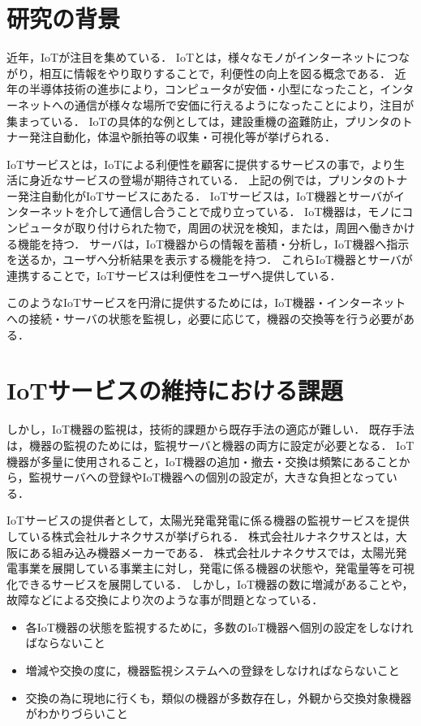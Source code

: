 \section{研究の背景}
近年，IoTが注目を集めている．
IoTとは，様々なモノがインターネットにつながり，相互に情報をやり取りすることで，利便性の向上を図る概念である．
近年の半導体技術の進歩により，コンピュータが安価・小型になったこと，インターネットへの通信が様々な場所で安価に行えるようになったことにより，注目が集まっている．
IoTの具体的な例としては，建設重機の盗難防止，プリンタのトナー発注自動化，体温や脈拍等の収集・可視化等が挙げられる．
\medskip

IoTサービスとは，IoTによる利便性を顧客に提供するサービスの事で，より生活に身近なサービスの登場が期待されている．
上記の例では，プリンタのトナー発注自動化がIoTサービスにあたる．
IoTサービスは，IoT機器とサーバがインターネットを介して通信し合うことで成り立っている．
IoT機器は，モノにコンピュータが取り付けられた物で，周囲の状況を検知，または，周囲へ働きかける機能を持つ．
サーバは，IoT機器からの情報を蓄積・分析し，IoT機器へ指示を送るか，ユーザへ分析結果を表示する機能を持つ．
これらIoT機器とサーバが連携することで，IoTサービスは利便性をユーザへ提供している．
\medskip

このようなIoTサービスを円滑に提供するためには，IoT機器・インターネットへの接続・サーバの状態を監視し，必要に応じて，機器の交換等を行う必要がある．

\section{IoTサービスの維持における課題}
しかし，IoT機器の監視は，技術的課題から既存手法の適応が難しい．
既存手法は，機器の監視のためには，監視サーバと機器の両方に設定が必要となる．
IoT機器が多量に使用されること，IoT機器の追加・撤去・交換は頻繁にあることから，監視サーバへの登録やIoT機器への個別の設定が，大きな負担となっている．
\medskip

IoTサービスの提供者として，太陽光発電発電に係る機器の監視サービスを提供している株式会社ルナネクサスが挙げられる．
株式会社ルナネクサスとは，大阪にある組み込み機器メーカーである．
株式会社ルナネクサスでは，太陽光発電事業を展開している事業主に対し，発電に係る機器の状態や，発電量等を可視化できるサービスを展開している．
しかし，IoT機器の数に増減があることや，故障などによる交換により次のような事が問題となっている．
\begin{itemize}
\item 各IoT機器の状態を監視するために，多数のIoT機器へ個別の設定をしなければならないこと
\item 増減や交換の度に，機器監視システムへの登録をしなければならないこと
\item 交換の為に現地に行くも，類似の機器が多数存在し，外観から交換対象機器がわかりづらいこと
\end{itemize}

